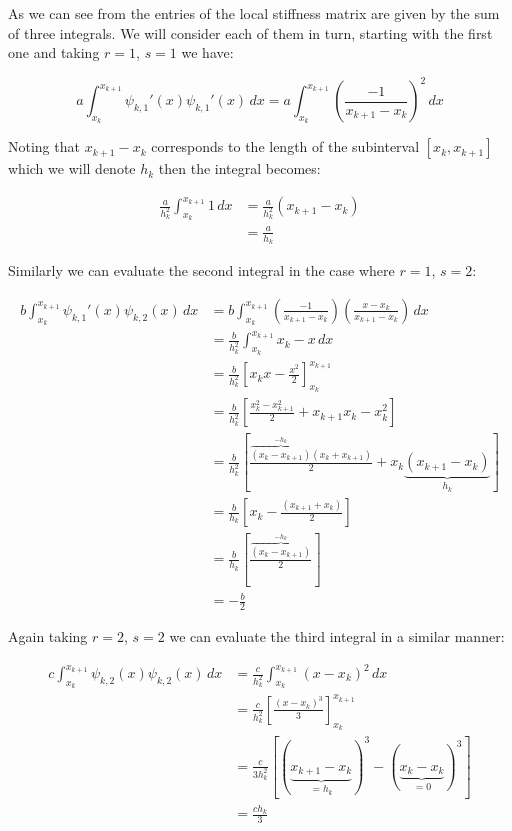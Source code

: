 As we can see from  the entries of
the local stiffness matrix are given by the sum of three integrals. We will
consider each of them in turn, starting with the first one and taking $r = 1$,
$s = 1$ we have:

\begin{equation*}
       a\int_{x_k}^{x_{k+1}}\psi_{k,1}'(x)\psi_{k,1}'(x)\, dx =
         a\int_{x_k}^{x_{k+1}}\left(\frac{-1}{x_{k+1} - x_k}\right)^2\, dx
\end{equation*}

Noting that $x_{k+1} - x_k$ corresponds to the length of the subinterval
$[x_k, x_{k+1}]$ which we will denote $h_k$ then the integral becomes:

\begin{align*}
    \frac{a}{h_k^2}\int_{x_k}^{x_{k+1}}1\, dx &= \frac{a}{h_k^2}(x_{k+1} - x_k) \\
          &= \frac{a}{h_k}
\end{align*}

Similarly we can evaluate the second integral in the case where $r=1$, $s=2$:

\begin{align*}
    b\int_{x_k}^{x_{k+1}}\psi_{k,1}'(x)\psi_{k,2}(x)\, dx
      &=  b\int_{x_k}^{x_{k+1}}\left(\frac{-1}{x_{k+1} - x_k}\right)
                               \left(\frac{x - x_k}{x_{k+1} - x_k}\right)\, dx \\
      &= \frac{b}{h_k^2}\int_{x_k}^{x_{k+1}}x_k - x\, dx \\
      &= \frac{b}{h_k^2}\left[x_kx - \frac{x^2}{2}\right]_{x_k}^{x_{k+1}} \\
      &= \frac{b}{h_k^2}\left[ \frac{x_k^2 - x_{k+1}^2}{2} + x_{k+1}x_k - x_k^2 \right] \\
      &= \frac{b}{h_k^2}\left[ \frac{\overbrace{(x_k - x_{k+1})}^{-h_k}(x_k + x_{k+1})}{2}
              + x_k\underbrace{(x_{k+1} - x_k)}_{h_k}\right] \\
      &= \frac{b}{h_k}\left[ x_k - \frac{(x_{k+1} + x_k)}{2} \right] \\
      &= \frac{b}{h_k}\left[\frac{\overbrace{(x_k - x_{k+1})}^{-h_k}}{2}\right] \\
      &= -\frac{b}{2}
\end{align*}

Again taking $r=2$, $s=2$ we can evaluate the third integral in a similar manner:

\begin{align*}
    c\int_{x_k}^{x_{k+1}}\psi_{k,2}(x)\psi_{k,2}(x)\, dx
       &= \frac{c}{h_k^2}\int_{x_k}^{x_{k + 1}}(x - x_k)^2\, dx \\
       &= \frac{c}{h_k^2}\left[ \frac{(x - x_k)^3}{3} \right]_{x_k}^{x_{k+1}} \\
       &= \frac{c}{3h_k^2}\left[ (\underbrace{x_{k+1} - x_k}_{= h_k})^3
                            -(\underbrace{x_k - x_k}_{=0})^3\right] \\
       &= \frac{ch_k}{3}
\end{align*}

